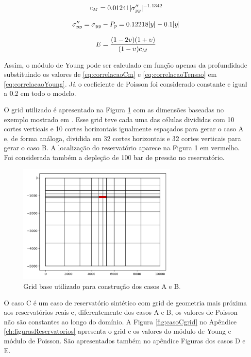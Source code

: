 \begin{equation} \label{eq:correlacaoCm}
    c_M = 0.01241 |\sigma^{\prime\prime}_{yy}|^{-1.1342}
\end{equation}

\begin{equation} \label{eq:correlacaoTensao}
\sigma^{\prime\prime}_{yy} = \sigma_{yy} - P_p = 0.12218|y| - 0.1 |y|
\end{equation}

\begin{equation} \label{eq:correlacaoYoung}
    E = \frac{(1-2\upsilon)(1+\upsilon)}{(1-\upsilon)c_M}
\end{equation}

Assim, o módulo de Young pode ser calculado em função apenas da profundidade substituindo os valores de \eqref{eq:correlacaoCm} e \eqref{eq:correlacaoTensao} em \eqref{eq:correlacaoYoung}. Já o coeficiente de Poisson foi considerado constante e igual a 0.2 em todo o modelo. 


O grid utilizado é apresentado na Figura \ref{fig:gridBase10x10} com as dimensões baseadas no exemplo mostrado em \cite{casteletto}. Esse grid teve cada uma das células divididas com 10 cortes verticais e 10 cortes horizontais igualmente espaçados  para gerar o caso A e, de forma análoga, dividida em 32 cortes horizontais e 32 cortes verticais para gerar o caso B. A localização do reservatório aparece na Figura \ref{fig:gridBase10x10} em vermelho. Foi considerada também a depleção de 100 bar de pressão no reservatório.

\begin{figure}[!htbp]
    \centering
    \includegraphics[height=6cm]{chap08/figs/Reservoir10x10_grid.png}
    \caption{Grid base utilizado para construção dos casos A e B.}
    \label{fig:gridBase10x10}
\end{figure}


\if{}
O caso C é um caso de reservatório sintético com grid de geometria mais próxima aos reservatórios reais e, diferentemente dos casos A e B, os valores de Poisson não são constantes ao longo do domínio. A Figura \ref{fig:casoCgrid} no Apêndice \ref{ch:figurasReservatorios} apresenta o grid e os valores do módulo de Young e módulo de Poisson. São apresentados também no apêndice Figuras dos casos D e E.
\else

